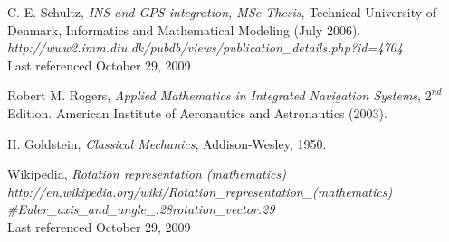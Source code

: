 \documentclass{gen-j-l}
\theoremstyle{definition}
\theoremstyle{remark}
\numberwithin{equation}{section}
\begin{document}

\begin{thebibliography}{99}
C. E. Schultz, {\it INS and GPS integration,  MSc Thesis}, 
Technical University of Denmark,
Informatics and Mathematical Modeling (July 2006). \\
{\em http://www2.imm.dtu.dk/pubdb/views/publication\_details.php?id=4704 }\\ 
{\small Last referenced October 29, 2009}

Robert M. Rogers, {\it Applied Mathematics in Integrated 
Navigation Systems}, $2^{nd}$ Edition.  American Institute of 
Aeronautics and Astronautics (2003).

H. Goldstein, {\it Classical Mechanics}, Addison-Wesley, 1950. 

Wikipedia, {\it Rotation representation (mathematics)}\\
{\em http://en.wikipedia.org/wiki/Rotation\_representation\_(mathematics) \\
\#Euler\_axis\_and\_angle\_.28rotation\_vector.29}\\
{\small Last referenced October 29, 2009}
 
\end{thebibliography}
\end{document}
